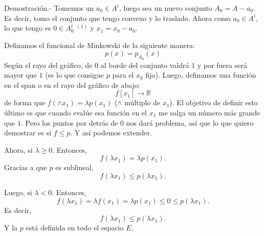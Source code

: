\begin{paracol}{2}
\begin{teo}
    Demostración.-\; Tomemos un $a_0\in A^i$, luego sea un nuevo conjunto $A_0=A-a_0$. Es decir, tomo el conjunto que tengo convexo y lo traslado. Ahora como $a_0\in A^i$, lo que tengo es $0\in A_0^i$ $^{(1)}$ y $x_1=x_0-a_0$.

    Definamos el funcional de Minkowski de la siguiente manera: 
    $$p(x)=p_{A_0}(x)$$
    Según el rayo del gráfico, de $0$ al borde del conjunto valdrá $1$ y por fuera será mayor que $1$ (es lo que consigue $p$ para el $x_0$ fijo).
    Luego, definamos una función en el span o en el rayo del gráfico de abajo:
    $$f[x_1]\to \mathbb{R}$$
    de forma que 
    $f(\land x_1)=\lambda p(x_1)$
    ($\land$ múltiplo de $x_1$). El objetivo de definir esto último es que cuando evalúe esa función en el $x_1$ me salga un número más grande que $1$. Pero los puntos por detrás de $0$ nos dará problema, así que lo que quiero demostrar es si $f\leq p$. Y así podemos extender. 

    Ahora, si $\lambda\geq 0$. Entonces, 
    $$f(\lambda x_1)=\lambda p(x_1).$$ 
    Gracias a que $p$ es sublineal,
    $$f(\lambda x_1) \leq p(\lambda x_1).$$

    Luego, si $\lambda<0$. Entonces, 
    $$f(\lambda x_1)=\lambda f(x_1)=\lambda p(x_1)\leq 0\leq p(\lambda x_1).$$
    Es decir,
    $$f(\lambda x_1)\leq p(\lambda x_1).$$
    Y la $p$ está definida en todo el espacio $E$.
\end{teo}


\end{paracol}
